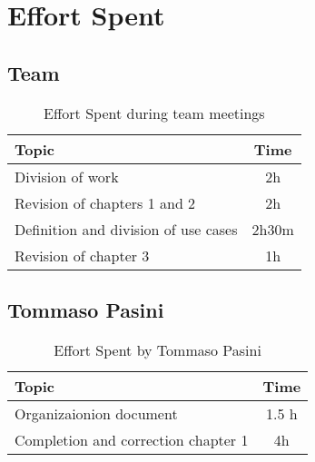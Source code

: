 \chapter{Effort Spent}

\section*{Team}


\begin{table}[H]
    \renewcommand{\arraystretch}{1.5}
    \centering
    \begin{tabular}{|l|c|}
        \hline
        \textbf{Topic}                       & \textbf{Time} \\ \hline
        Division of work                     & 2h            \\ \hline
        Revision of chapters 1 and 2         & 2h            \\ \hline
        Definition and division of use cases & 2h30m         \\ \hline
        Revision of chapter 3                & 1h            \\ \hline
    \end{tabular}
    \caption{Effort Spent during team meetings}
    \label{tab:group-effort-spent}
\end{table}

\section*{Tommaso Pasini}
\begin{table}[H]
    \renewcommand{\arraystretch}{1.5}
    \centering
    \begin{tabular}{|l|c|}
        \hline
        \textbf{Topic}                      & \textbf{Time} \\ \hline
        Organizaionion document             & 1.5 h         \\ \hline
        Completion and correction chapter 1 & 4h            \\ \hline
    \end{tabular}
    \caption{Effort Spent by Tommaso Pasini}
    \label{tab:pasini-effort-spent}
\end{table}

